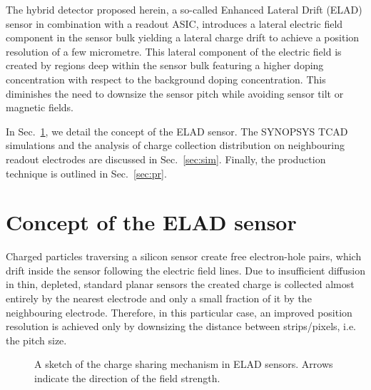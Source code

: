 \documentclass[a4paper,11pt]{article}
\begin{document}
The hybrid detector proposed herein, a so-called Enhanced Lateral Drift (ELAD) sensor in combination with a readout ASIC,
 introduces a lateral electric field component in the sensor bulk yielding a lateral charge drift to achieve a position resolution of a few micrometre. 
This lateral component of the electric field is created by regions deep within the sensor bulk featuring a higher doping concentration with respect to the background doping concentration.
This diminishes the need to downsize the sensor pitch while avoiding sensor tilt or magnetic fields. 

In Sec.~\ref{sec:con}, we detail the concept of the ELAD sensor.
The SYNOPSYS TCAD simulations and the analysis of charge collection distribution on neighbouring readout electrodes are discussed in Sec.~\ref{sec:sim}.
Finally, the production technique is outlined in Sec.~\ref{sec:pr}. 


\section{Concept of the ELAD sensor}
\label{sec:con}
Charged particles traversing a silicon sensor create free electron-hole pairs, which drift inside the sensor following the electric field lines.
Due to insufficient diffusion in thin, depleted, standard planar sensors the created charge is collected almost entirely by the nearest electrode and only a small fraction of it by the neighbouring electrode.
Therefore, in this particular case, an improved position resolution is achieved only by downsizing the distance between strips/pixels, i.e. the pitch size.

\begin{figure}[t]
  \centering
  \vspace{5.5cm}
  \caption{
A sketch of the charge sharing mechanism in ELAD sensors. 
Arrows indicate the direction of the field strength. 
}
  \label{fig:concept}
\end{figure}
\end{document}
